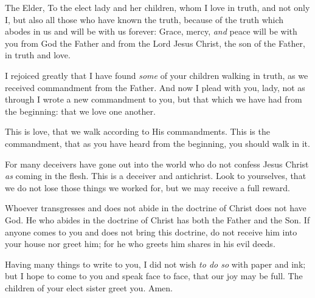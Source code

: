 
\bverse The Elder, To the elect lady and her children, whom I love in truth, and not only I, but also all those who have known the truth,
\bverse because of the truth which abodes in us and will be with us forever:
\bverse Grace, mercy, \textit{and} peace will be with you from God the Father and from the Lord Jesus Christ, the son of the Father, in truth and love.


\bverse I rejoiced greatly that I have found \textit{some} of your children walking in truth, as we received commandment from the Father.
\bverse And now I plead with you, lady, not as through I wrote a new commandment to you, but that which we have had from the beginning: that we love one another.

\bverse This is love, that we walk according to His commandments. This is the commandment, that as you have heard from the beginning, you should walk in it.


\bverse For many deceivers have gone out into the world who do not confess Jesus Christ \textit{as} coming in the flesh. This is a deceiver and antichrist.
\bverse Look to yourselves, that we do not lose those things we worked for, but \that we may receive a full reward.

\bverse Whoever transgresses and does not abide in the doctrine of Christ does not have God. He who abides in the doctrine of Christ has both the Father and the Son.
\bverse If anyone comes to you and does not bring this doctrine, do not receive him into your house nor greet him;
\bverse for he who greets him shares in his evil deeds.


\bverse Having many things to write to you, I did not wish \textit{to do so} with paper and ink; but I hope to come to you and speak face to face, that our joy may be full.
\bverse The children of your elect sister greet you. Amen.
